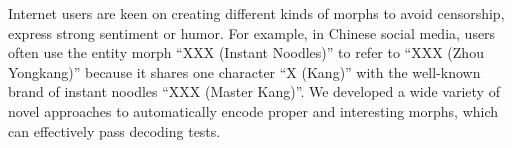 Internet users are keen on creating different kinds of morphs to avoid censorship, express strong sentiment or humor. For example, in Chinese social media, users often use the entity morph ``XXX (Instant Noodles)'' to refer to ``XXX (Zhou Yongkang)'' because it shares one character ``X (Kang)'' with the well-known brand of instant noodles ``XXX (Master Kang)''. We developed a wide variety of novel approaches to automatically encode proper and interesting morphs, which can effectively pass decoding tests.
